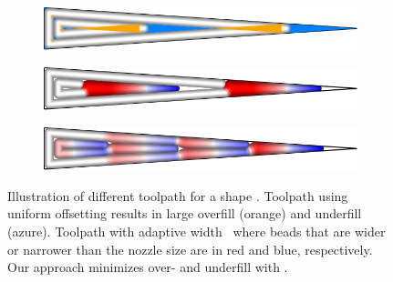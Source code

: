 \begin{figure}\centering
\setlength{\figwidth}{.9\columnwidth}
\setlength{\figwidthTwo}{.05\columnwidth}
\begin{subfigure}{\figwidth}\centering
\parbox[b]{\figwidthTwo}{\subcaption{}\label{intro_wedge_uniform}}\includegraphics[width=\figwidth]{sources-intro-TEST-naive-accuracy.png}
\end{subfigure}
\begin{subfigure}{\figwidth}\centering
\parbox[b]{\figwidthTwo}{\subcaption{}\label{intro_wedge_centered}}\includegraphics[width=\figwidth]{sources-intro-TEST-Center-widths.png}
\end{subfigure}
\begin{subfigure}{\figwidth}\centering
\parbox[b]{\figwidthTwo}{\subcaption{}\label{intro_wedge_distributed}}\includegraphics[width=\figwidth]{sources-intro-TEST-Distributed-widths.png}
\end{subfigure}
\caption{
Illustration of different toolpath for a shape .
 Toolpath using uniform offsetting results in large overfill (orange) and underfill (azure).
 Toolpath with adaptive width~\cite{Jin2017JMS} where beads that are wider or narrower than the nozzle size are  in red and blue, respectively.
 Our approach minimizes over- and underfill with .
}
\label{intro_wedge}
\end{figure}


